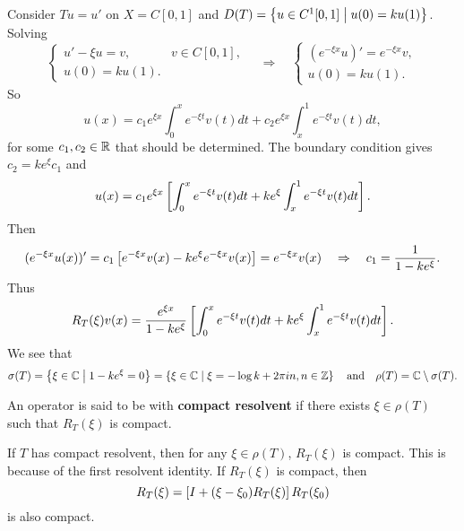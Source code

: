 \begin{example}
    Consider $Tu = u'$ on $X = C[0,1]$ and $D(T) = \left\{ u\in C^1[0,1] \;\middle\vert\; u(0) = ku(1) \right\}$. 
    Solving 
    \begin{equation*}
        \begin{cases}
            u' - \xi u = v, & v\in C[0,1], \\
            u(0) = ku(1).
        \end{cases}\quad\Rightarrow\quad
        \begin{cases}
            (e^{-\xi x}u)' = e^{-\xi x}v, \\
            u(0) = ku(1).
        \end{cases}
    \end{equation*}
    So 
    \begin{equation*}
        u(x) = c_1 e^{\xi x}\int_0^x e^{-\xi t}v(t)dt + c_2 e^{\xi x}\int_x^1 e^{-\xi t}v(t)dt,
    \end{equation*}
    for some $c_1,c_2\in\mathbb{R}$ that should be determined. The 
    boundary condition gives $c_2 = ke^\xi c_1$ and 
    \begin{equation*}
        u(x) = c_1e^{\xi x}\left[ {\int_0^x e^{-\xi t}v(t)dt + ke^\xi\int_x^1 e^{-\xi t}v(t)dt} \right].
    \end{equation*}
    Then 
    \begin{equation*}
        (e^{-\xi x}u(x))' = c_1\left[ {e^{-\xi x}v(x) - ke^\xi e^{-\xi x}v(x)} \right] = e^{-\xi x}v(x) 
        \quad\Rightarrow\quad 
        c_1 = \frac{1}{1-ke^\xi}.  
    \end{equation*}
    Thus 
    \begin{equation*}
        R_T(\xi)v(x) = \frac{e^{\xi x}}{1-ke^\xi}\left[ {\int_0^x e^{-\xi t}v(t)dt + ke^\xi\int_x^1 e^{-\xi t}v(t)dt} \right].
    \end{equation*}
    We see that 
    \begin{equation*}
        \sigma(T) = \left\{ \xi\in\mathbb{C} \;\middle\vert\; 1 - ke^\xi = 0 \right\} = \left\{ \xi\in\mathbb{C} \;\middle\vert\; \xi = -\log k + 2\pi i n, n\in\mathbb{Z} \right\}
        \quad\text{and}\quad 
        \rho(T) = \mathbb{C}\setminus\sigma(T).
    \end{equation*}
\end{example}

\begin{definition}
    An operator is said to be with \textbf{compact resolvent} if there exists 
    $\xi\in\rho(T)$ such that $R_T(\xi)$ is compact.
\end{definition}
\begin{remark}
    If $T$ has compact resolvent, then for any $\xi\in\rho(T)$, 
    $R_T(\xi)$ is compact. This is because of the first resolvent identity. 
    If $R_T(\xi)$ is compact, then 
    \begin{equation*}
        R_T(\xi) = \left[ {I + (\xi - \xi_0)R_T(\xi)} \right]R_T(\xi_0)
    \end{equation*}
    is also compact. 
\end{remark}


